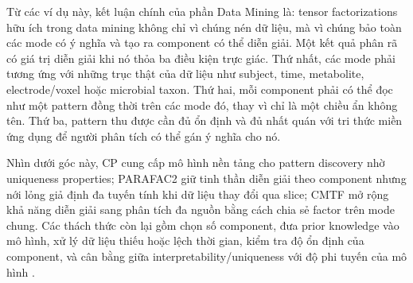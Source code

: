 Từ các ví dụ này, kết luận chính của phần Data Mining là: tensor factorizations hữu ích
trong data mining không chỉ vì chúng nén dữ liệu, mà vì chúng bảo toàn các mode
có ý nghĩa và tạo ra component có thể diễn giải. Một kết quả phân rã có giá trị
diễn giải khi nó thỏa ba điều kiện trực giác. Thứ nhất, các mode
phải tương ứng với những trục thật của dữ liệu như subject, time, metabolite,
electrode/voxel hoặc microbial taxon. Thứ hai, mỗi component phải có thể đọc như
một pattern đồng thời trên các mode đó, thay vì chỉ là một chiều ẩn không tên.
Thứ ba, pattern thu được cần đủ ổn định và đủ nhất quán với tri thức miền ứng
dụng để người phân tích có thể gán ý nghĩa cho nó.

Nhìn dưới góc này, CP cung cấp mô hình nền tảng cho pattern discovery nhờ
uniqueness properties; PARAFAC2 giữ tinh thần diễn giải theo component nhưng nới
lỏng giả định đa tuyến tính khi dữ liệu thay đổi qua slice; CMTF mở rộng khả
năng diễn giải sang phân tích đa nguồn bằng cách chia sẻ factor trên mode chung.
Các thách thức còn lại gồm chọn số component, đưa prior knowledge
vào mô hình, xử lý dữ liệu thiếu hoặc lệch thời gian, kiểm tra độ ổn định của
component, và cân bằng giữa interpretability/uniqueness với độ phi tuyến của mô
hình \cite{chrysos2025foundationsTutorial}.



